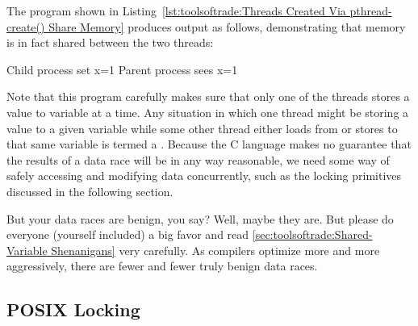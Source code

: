 The program shown in
Listing~\ref{lst:toolsoftrade:Threads Created Via pthread-create() Share Memory}
produces output as follows, demonstrating that memory is in fact
shared between the two threads:

\begin{VerbatimU}
Child process set x=1
Parent process sees x=1
\end{VerbatimU}

Note that this program carefully makes sure that only one of the threads
stores a value to variable  at a time.
Any situation in which one thread might be storing a value to a given
variable while some other thread either loads from or stores to that
same variable is termed a \emph{}.
Because the C language makes no guarantee that the results of a data race
will be in any way reasonable, we need some way of safely accessing
and modifying data concurrently, such as the locking primitives discussed
in the following section.

But your data races are benign, you say?
Well, maybe they are.
But please do everyone (yourself included) a big favor and read
\cref{sec:toolsoftrade:Shared-Variable Shenanigans}
very carefully.
As compilers optimize more and more aggressively, there are fewer and
fewer truly benign data races.

\QuickQuizEnd

\subsection{POSIX Locking}
\label{sec:toolsoftrade:POSIX Locking}

